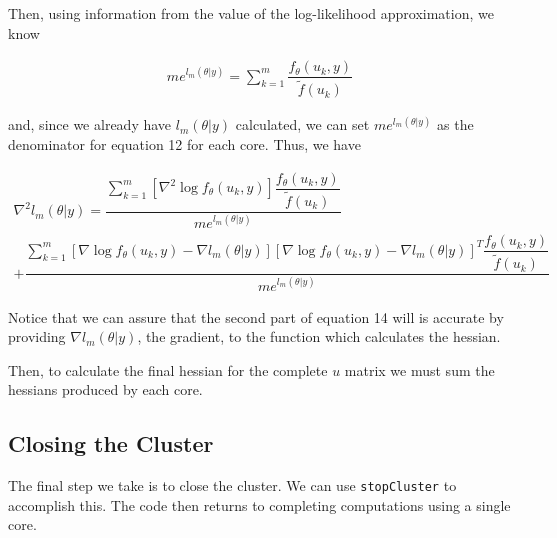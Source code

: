 \documentclass{article}
\begin{document}
\noindent Then, using information from the value of the log-likelihood approximation, we know

\begin{align}
m e^{l_m(\theta|y)} = \sum\limits_{k=1}^m \dfrac{f_\theta(u_k, y)}{\tilde{f}(u_k)}
\end{align}

\noindent and, since we already have $l_m(\theta|y)$ calculated, we can set $m e^{l_m(\theta|y)}$ as the denominator for equation 12 for each core. Thus, we have

\begin{multline}
\nabla^2 l_m(\theta|y)= \dfrac{   \sum_{k=1}^m \left[ \nabla^2 \log f_\theta(u_k,y)     \right]  \dfrac{ f_\theta(u_k,y)}{\tilde{f}(u_k)}  }{m e^{l_m(\theta|y)}}\\
+ \dfrac{   \sum_{k=1}^m \left[ \nabla \log f_\theta(u_k,y)  - \nabla l_m(\theta|y)   \right] \left[ \nabla \log f_\theta(u_k,y)  -\nabla l_m(\theta|y)  \right]^T  \dfrac{ f_\theta(u_k,y)   }{\tilde{f}(u_k)}   }{m e^{l_m(\theta|y)}}
\end{multline}

\noindent Notice that we can assure that the second part of equation 14 will is accurate by providing $\nabla l_m (\theta|y)$, the gradient, to the function which calculates the hessian. 

Then, to calculate the final hessian for the complete $u$ matrix we must sum the hessians produced by each core. 

\subsection{Closing the Cluster}
The final step we take is to close the cluster. We can use \texttt{stopCluster} to accomplish this. The code then returns to completing computations using a single core. 
\end{document}
